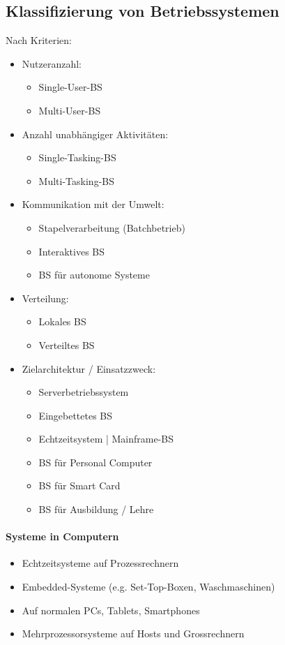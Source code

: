 \documentclass[a4paper,12pt]{article}
\begin{document}
\subsection{Klassifizierung von Betriebssystemen}
Nach Kriterien:
\begin{itemize}
\item Nutzeranzahl:
    \begin{itemize}
    \item Single-User-BS
    \item Multi-User-BS
    \end{itemize}
\item Anzahl unabhängiger Aktivitäten:
    \begin{itemize}
    \item Single-Tasking-BS
    \item Multi-Tasking-BS
    \end{itemize}
\item Kommunikation mit der Umwelt:
    \begin{itemize}
    \item Stapelverarbeitung (Batchbetrieb)
    \item Interaktives BS
    \item BS für autonome Systeme
    \end{itemize}
\item Verteilung:
    \begin{itemize}
    \item Lokales BS
    \item Verteiltes BS
    \end{itemize}
\item Zielarchitektur / Einsatzzweck:
    \begin{itemize}
    \item Serverbetriebssystem
    \item Eingebettetes BS
    \item Echtzeitsystem | Mainframe-BS
    \item BS für Personal Computer
    \item BS für Smart Card
    \item BS für Ausbildung / Lehre
    \end{itemize}
\end{itemize}

\paragraph{Systeme in Computern}
\begin{itemize}
\item Echtzeitsysteme auf Prozessrechnern
\item Embedded-Systeme (e.g. Set-Top-Boxen, Waschmaschinen)
\item Auf normalen PCs, Tablets, Smartphones
\item Mehrprozessorsysteme auf Hosts und Grossrechnern
\end{itemize}
\end{document}
